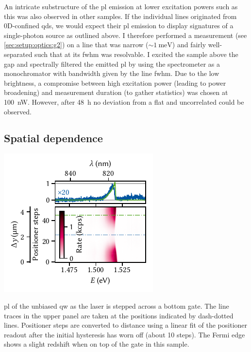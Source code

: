 An intricate substructure of the \gls{pl} emission at lower excitation powers such as this was also observed in other samples.
If the individual lines originated from 0D-confined \glspl{qd}, we would expect their \gls{pl} emission to display signatures of a single-photon source as outlined above. %
I therefore performed a  measurement (see \cref{sec:setup:optics:g2}) on a line that was narrow ($\sim\qty{1}{\milli\electronvolt}$) and fairly well-separated such that at its \gls{fwhm} was resolvable.
I excited the sample above the gap and spectrally filtered the emitted \gls{pl} by using the spectrometer as a monochromator with bandwidth given by the line \gls{fwhm}.
Due to the low brightness, a compromise between high excitation power (leading to power broadening) and measurement duration (to gather statistics) was chosen at \qty{100}{\nano\watt}.
However, after \qty{48}{\hour} no deviation from a flat and uncorrelated  could be observed.

\subsection{Spatial dependence}\label{subsec:exp:observations:pl:spatial}
\begin{marginfigure}
    \centering
    \includegraphics{img/pdf/experiment/fig_F10_positioning}
    \caption[
        $V_{y}=\qty{30}{\volt}$
        \protect\newline
    ]{
        \Gls{pl} of the unbiased \gls{qw} as the laser is stepped across a bottom gate.
        The line traces in the upper panel are taken at the positions indicated by dash-dotted lines.
        Positioner steps are converted to distance using a linear fit of the positioner readout after the initial hysteresis has worn off (about \num{10} steps).
        The Fermi edge shows a slight redshift when on top of the gate in this sample.
    }
    \label{fig:exp:pl:fig_F10_positioning}
\end{marginfigure}


